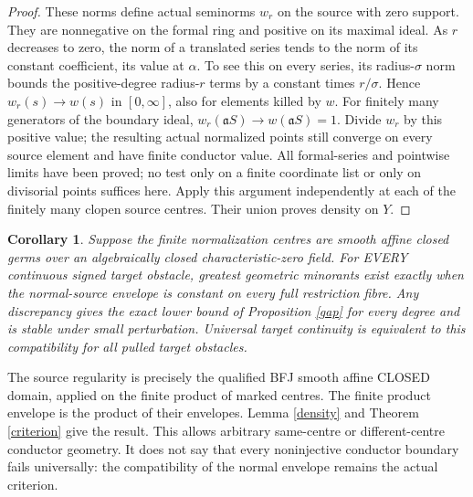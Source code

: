 \documentclass[11pt]{article}
\newtheorem{corollary}[theorem]{Corollary}
\newcommand{\aa}{\mathfrak a}
\begin{document}
\begin{proof}
These norms define actual seminorms $w_r$ on the source with zero support.
They are nonnegative on the formal ring and positive on its maximal
ideal. As $r$ decreases to zero, the norm of a translated series tends
to the norm of its constant coefficient, its value at $\alpha$.
To see this on every series, its radius-$\sigma$ norm bounds the
positive-degree radius-$r$ terms by a constant times $r/\sigma$.
Hence $w_r(s)\to w(s)$ in $[0,\infty]$, also for elements killed by $w$.
For finitely many generators of the boundary ideal,
$w_r(\aa S)\to w(\aa S)=1$. Divide $w_r$ by this positive value;
the resulting actual normalized points still converge on every source
element and have finite conductor value. All formal-series and pointwise
limits have been proved; no test only on a finite coordinate list or
only on divisorial points suffices here.
Apply this argument independently at each of the finitely many clopen
source centres. Their union proves density on $Y$.
\end{proof}

\begin{corollary}
Suppose the finite normalization centres are smooth affine closed germs
over an algebraically closed characteristic-zero field.
For EVERY continuous signed target obstacle, greatest geometric minorants
exist exactly when the normal-source envelope is constant on every full
restriction fibre. Any discrepancy gives the exact lower bound of
Proposition \ref{gap} for every degree and is stable under small perturbation.
Universal target continuity is equivalent to this compatibility for all
pulled target obstacles.
\end{corollary}
The source regularity is precisely the qualified BFJ smooth affine CLOSED
domain, applied on the finite product of marked centres. The finite product
envelope is the product of their envelopes. Lemma \ref{density} and
Theorem \ref{criterion} give the result. This allows arbitrary same-centre
or different-centre conductor geometry. It does not say that every
noninjective conductor boundary fails universally: the compatibility of
the normal envelope remains the actual criterion.
\end{document}
